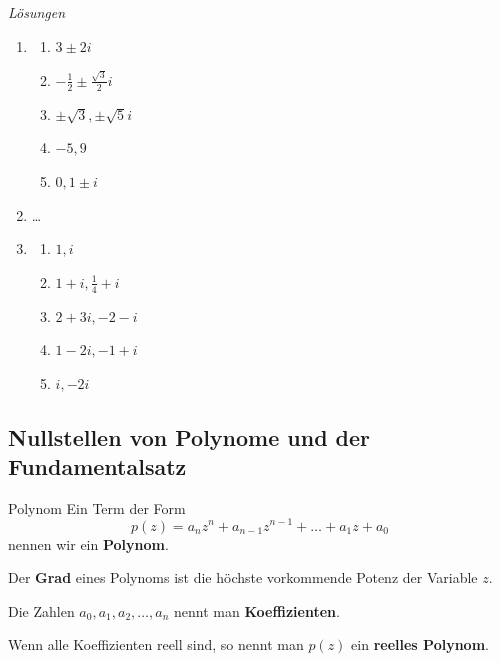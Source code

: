 \clearpage
\emph{Lösungen}
\begin{enumerate}
    \item \begin{enumerate}
        \item \( 3 \pm 2i \)
        \item \( -\frac{1}{2} \pm \frac{\sqrt{3}}{2} i \)
        \item \( \pm \sqrt{3}, \pm \sqrt{5} i \)
        \item $-5, 9$
        \item \( 0, 1 \pm i \)
    \end{enumerate}
    \item \dots%
    \item 
        \begin{enumerate}
            \item \( 1, i \)
            \item \( 1 + i, \frac{1}{4} + i \)
            \item \( 2 + 3i, -2 - i \)
            \item \( 1 - 2i, -1 + i \)
            \item $i, -2i$
        \end{enumerate}
    
    
\end{enumerate}
























\clearpage
\subsection{Nullstellen von Polynome und der Fundamentalsatz}
\begin{definition}
    {Polynom}{}
    Ein Term der Form
\[
p(z) = a_n z^n + a_{n-1} z^{n-1} + \dots + a_1 z + a_0
\]
nennen wir ein \textbf{Polynom}.

Der \textbf{Grad} eines Polynoms ist die höchste vorkommende Potenz der Variable \( z \).

Die Zahlen \( a_0, a_1, a_2, \dots, a_n \) nennt man \textbf{Koeffizienten}.

Wenn alle Koeffizienten reell sind, so nennt man \( p(z) \) ein \textbf{reelles Polynom}.

\end{definition}

